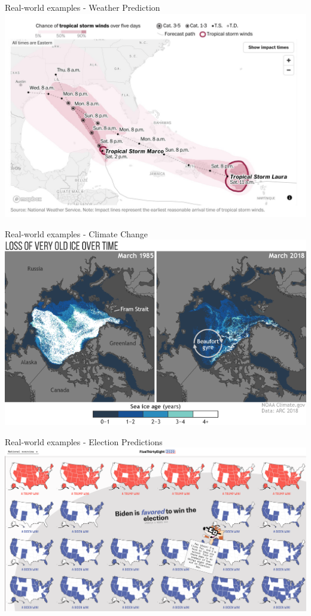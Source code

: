 \documentclass{beamer}
\begin{document}
\begin{frame}{Real-world examples - Weather Prediction}
    \includegraphics[width=\linewidth]{hurricane.jpg}
\end{frame}

\begin{frame}{Real-world examples - Climate Change}
    \includegraphics[width=\linewidth]{sea_ice.png}
\end{frame}

\begin{frame}{Real-world examples - Election Predictions}
    \includegraphics[width=\linewidth]{538_1.png}
\end{frame}
\end{document}
